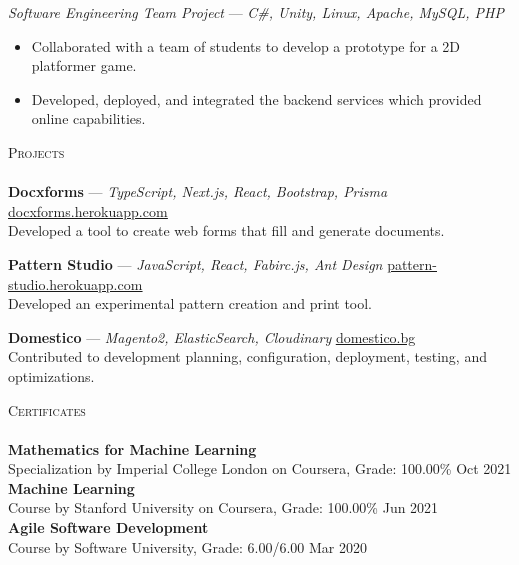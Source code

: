 \documentclass[a4paper]{article}
\newcommand{\lineunder} {
    \vspace*{-8pt} \\
    \hspace*{-18pt} \hrulefill \\
}
\newcommand{\header} [1] {
    {\hspace*{-18pt}\vspace*{6pt} \textsc{#1}}
    \vspace*{-6pt} \lineunder
}
\begin{document}
{\textit{Software Engineering Team Project}} — {\sl C\#, Unity, Linux, Apache, MySQL, PHP}\
\vspace{-1mm}
\begin{itemize} \itemsep 1pt
    \item Collaborated with a team of students to develop a prototype for a 2D platformer game.
    \item Developed, deployed, and integrated the backend services which provided online capabilities.
\end{itemize}

\header{Projects}
{\textbf{Docxforms}} — {\sl TypeScript, Next.js, React, Bootstrap, Prisma} \hfill \href{https://docxforms.herokuapp.com/}{\underline{docxforms.herokuapp.com}}\\
Developed a tool to create web forms that fill and generate documents.
\vspace*{1mm}

{\textbf{Pattern Studio}} — {\sl JavaScript, React, Fabirc.js, Ant Design} \hfill \href{https://pattern-studio.herokuapp.com/}{\underline{pattern-studio.herokuapp.com}}\\
Developed an experimental pattern creation and print tool.
\vspace*{1mm}

{\textbf{Domestico}} — {\sl Magento2, ElasticSearch, Cloudinary} \hfill \href{https://domestico.bg/}{\underline{domestico.bg}}\\
Contributed to development planning, configuration, deployment, testing, and optimizations.
\vspace*{1mm}

\header{Certificates}
\textbf{Mathematics for Machine Learning}\\
Specialization by Imperial College London on Coursera, Grade: 100.00\% \hfill Oct 2021\\
\vspace*{1mm}
\textbf{Machine Learning}\\
Course by Stanford University on Coursera, Grade: 100.00\% \hfill Jun 2021\\
\vspace*{1mm}
\textbf{Agile Software Development}\\
Course by Software University, Grade: 6.00/6.00 \hfill Mar 2020\\
\vspace*{1mm}


\
\end{document}
